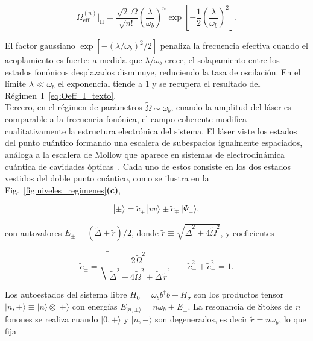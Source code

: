 \begin{equation}
	\Omega_\mathrm{eff}^{(n)}\Big|_\mathrm{II}
	= \frac{\sqrt{2}\,\Omega}{\sqrt{n!}}
	\left(\frac{\lambda}{\omega_b}\right)^{\!n}
	\exp\!\left[-\frac{1}{2}\!\left(\frac{\lambda}{\omega_b}\right)^{\!2}\right].
	\label{eq:Oeff_II_texto}
\end{equation}

El factor gaussiano $\exp[-(\lambda/\omega_b)^2/2]$ penaliza la frecuencia efectiva cuando el acoplamiento es fuerte: a medida que $\lambda/\omega_b$ crece, el solapamiento entre los estados fonónicos desplazados disminuye, reduciendo la tasa de oscilación. En el límite $\lambda \ll \omega_b$ el exponencial tiende a $1$ y se recupera el resultado del Régimen~I~\eqref{eq:Oeff_I_texto}. \\

Tercero, en el régimen de parámetros $\widetilde\Omega \sim \omega_b$, cuando la amplitud del láser es comparable a la frecuencia fonónica, el campo coherente modifica cualitativamente la estructura electrónica del sistema. El láser viste los estados del punto cuántico formando una escalera de subespacios igualmente espaciados, análoga a la escalera de Mollow que aparece en sistemas de electrodinámica cuántica de cavidades ópticas~\cite{bin2020}. Cada uno de estos consiste en los dos estados vestidos del doble punto cuántico, como se ilustra en la Fig.~\ref{fig:niveles_regimenes}\textbf{(c)},

\begin{equation}
	|{\pm}\rangle = \tilde{c}_\pm\,|vv\rangle \pm \tilde{c}_\mp\,|\Psi_+\rangle,
	\label{eq:vestidos_texto}
\end{equation}

con autovalores $E_\pm = (\widetilde\Delta \pm \tilde{r})/2$, donde $\tilde{r} \equiv \sqrt{\widetilde\Delta^2 + 4\widetilde\Omega^2}$, y coeficientes

\begin{equation}
	\tilde{c}_\pm = \sqrt{\frac{2\widetilde\Omega^2}{\widetilde\Delta^2
			+ 4\widetilde\Omega^2 \pm \widetilde\Delta\,\tilde{r}}},
	\qquad \tilde{c}_+^2 + \tilde{c}_-^2 = 1.
	\label{eq:cpm_texto}
\end{equation}

Los autoestados del sistema libre $H_0 = \omega_b b^\dagger b + H_\sigma$ son los productos tensor $|n,\pm\rangle \equiv |n\rangle\otimes|\pm\rangle$ con energías $E_{|n,\pm\rangle} = n\omega_b + E_\pm$. La resonancia de Stokes de $n$ fonones se realiza cuando $|0,+\rangle$ y $|n,-\rangle$ son degenerados, es decir $\tilde{r} = n\omega_b$, lo que fija


